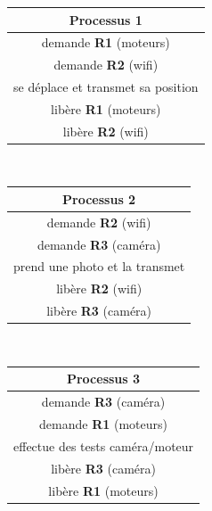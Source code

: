 \documentclass[12pt,a4paper,article,english,firamath]{nsi}
\begin{document}
\begin{center}
    \begin{tabular}{|c|}
        \hline
        \rowcolor{UGLiOrange} \textbf{\color{white}Processus 1 } \\
        \hline
        demande \textbf{R1} (moteurs)                            \\
        \hline
        demande \textbf{R2} (wifi)                               \\
        \hline
        se déplace et transmet sa position                       \\
        \hline
        libère \textbf{R1} (moteurs)                             \\
        \hline
        libère \textbf{R2} (wifi)                                \\
        \hline
    \end{tabular}
\end{center}
\ \\
\begin{center}
    \begin{tabular}{|c|}
        \hline
        \rowcolor{UGLiOrange} \textbf{\color{white}Processus 2} \\
        \hline
        demande \textbf{R2} (wifi)                              \\
        \hline
        demande \textbf{R3} (caméra)                            \\
        \hline
        prend une photo et la transmet                          \\
        \hline
        libère \textbf{R2} (wifi)                               \\
        \hline
        libère \textbf{R3} (caméra)                             \\
        \hline
    \end{tabular}
\end{center}
\ \\
\begin{center}
    \begin{tabular}{|c|}
        \hline
        \rowcolor{UGLiOrange}\textbf{\color{white}Processus 3} \\
        \hline
        demande \textbf{R3} (caméra)                           \\
        \hline
        demande \textbf{R1} (moteurs)                          \\
        \hline
        effectue des tests caméra/moteur                       \\
        \hline
        libère \textbf{R3} (caméra)                            \\
        \hline
        libère \textbf{R1} (moteurs)                           \\
        \hline
    \end{tabular}
\end{center}
\end{document}
